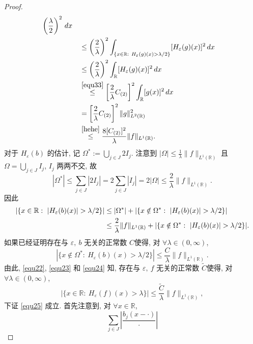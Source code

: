 \documentclass[a4paper,11pt]{article}
\theoremstyle{definition}
\begin{document}
\begin{CJK*}{UTF8}{gbsn}
\begin{proof}
\begin{align}
                    \left( \frac{\lambda}{2} \right)^2 \, dx \notag \\
           	&\quad\leq \left( \frac{2}{\lambda} \right)^2
                \int_{\{x\in\mathbb{R} :\ H_\varepsilon (g)(x) > \lambda/2 \}} [H_\varepsilon (g)(x)]^2\,dx \notag \\
           	&\quad\leq \left( \frac{2}{\lambda} \right)^2
                \int_{\mathbb{R}} [H_\varepsilon (g)(x)]^2 \, dx \notag \\
           	&\quad\overset{\eqref{equ33}}{\leq} \left[ \frac{2}{\lambda} C_{(2)} \right]^2  \int_{\mathbb{R}} [g(x)]^2 \, dx \notag \\
           	&\quad= \left[ \frac{2}{\lambda} C_{(2)} \right]^2  \| g \|_{L^2(\mathbb{R})}^2 \notag \\
            &\quad\overset{\eqref{hehe}}{\leq} \frac{8 [C_{(2)}]^2}{\lambda} \| f \|_{L^1(\mathbb{R})}. \notag
    \end{align}
    对于 $ H_\varepsilon (b) $ 的估计, 记 $\Omega^*:=\bigcup_{j \in J}2I_j$.
    注意到 $|\Omega|\leq \frac{1}{\lambda}\|f\|_{L^1(\mathbb{R})}$ 且 $\Omega=\bigcup_{j \in J}I_j$, $I_j$ 两两不交, 故
    $$|\Omega^*|\leq \sum_{j \in J}|2I_j|= 2\sum_{j \in J}|I_j|= 2|\Omega|\leq \frac{2}{\lambda}\|f\|_{L^1(\mathbb{R})}.$$
    因此 
    \begin{align} \label{equ24}
        |\{ x \in \mathbb{R} :\ |H_\varepsilon (b) (x)| > \lambda/2 \}| 
            &\leq |\Omega^*| + |\{ x \notin \Omega^* :\ |H_\varepsilon (b) (x)| > \lambda/2 \}|  \\
            &\leq \frac{2}{\lambda} \|f\|_{L^1(\mathbb{R})} 
                + |\{ x \notin \Omega^* :\ |H_\varepsilon (b) (x)| > \lambda/2 \}|. \notag
    \end{align}
    如果已经证明存在与 $ \varepsilon,\ b $ 无关的正常数 $ C $使得, 对 $ \forall \lambda \in (0, \infty) $,
    \begin{equation} \label{equ25}
        |\{x \notin \Omega^*:\ H_\varepsilon (b)(x) > \lambda / 2 \}|
            \leq \frac{C}{\lambda} \|f\|_{L^1(\mathbb{R})}.
    \end{equation}
    由此, \eqref{equ22}, \eqref{equ23} 和 \eqref{equ24} 知, 
    存在与 $ \varepsilon,\ f $ 无关的正常数 $ \widetilde{C} $使得, 对 $ \forall \lambda \in (0, \infty) $,
    $$
        |\{x \in \mathbb{R}:\ H_\varepsilon (f)(x) > \lambda \}|
            \leq \frac{\widetilde{C}}{\lambda} \|f\|_{L^1(\mathbb{R})},
    $$
    下证 \eqref{equ25} 成立.
    首先注意到, 对 $ \forall x \in \mathbb{R} $,
    $$
        \sum_{j \in J} \left| \frac{b_j(x - \cdot)}{\cdot} \right| 
$$
\end{proof}
\end{CJK*}
\end{document}
